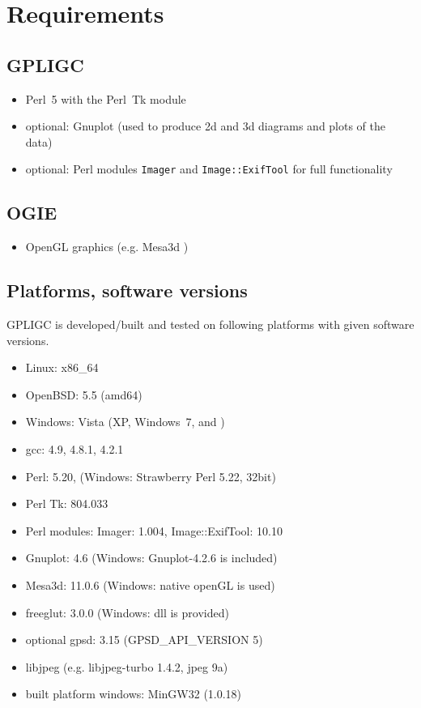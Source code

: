\section{Requirements}
\label{requirements}

\subsection*{GPLIGC}

\begin{itemize}
\item Perl~5 with the Perl~Tk module \cite{perl,perltk}
\item {\scriptsize optional:} Gnuplot \cite{gnuplot} (used to produce 2d and 3d diagrams and plots of the data)
\item {\scriptsize optional:} Perl modules \texttt{Imager} \cite{imager} and \texttt{Image::ExifTool} \cite{exiftool} for full functionality
\end{itemize}


\subsection*{OGIE}

\begin{itemize}
\item OpenGL graphics (e.g. Mesa3d \cite{mesa})
\end{itemize}


\subsection*{Platforms, software versions}
GPLIGC is developed/built and tested on following platforms with given software versions.

\begin{itemize}
\item Linux: x86\_64
\item OpenBSD: 5.5 (amd64)
\item Windows: Vista (XP, Windows~7, and )
\item gcc: 4.9, %
4.8.1, %
4.2.1 %
\item Perl: 5.20, %
(Windows: Strawberry Perl 5.22, 32bit)
\item Perl Tk: 804.033
\item Perl modules: Imager: 1.004, %
Image::ExifTool: 10.10
\item Gnuplot: 4.6 (Windows: Gnuplot-4.2.6 is included)
\item Mesa3d: 11.0.6 (Windows: native openGL is used)
\item freeglut: 3.0.0 (Windows: dll is provided)
\item {\scriptsize optional} gpsd: 3.15 (GPSD\_API\_VERSION 5)
\item libjpeg (e.g. libjpeg-turbo 1.4.2, jpeg 9a)
\item built platform windows: MinGW32 (1.0.18)
\end{itemize}


